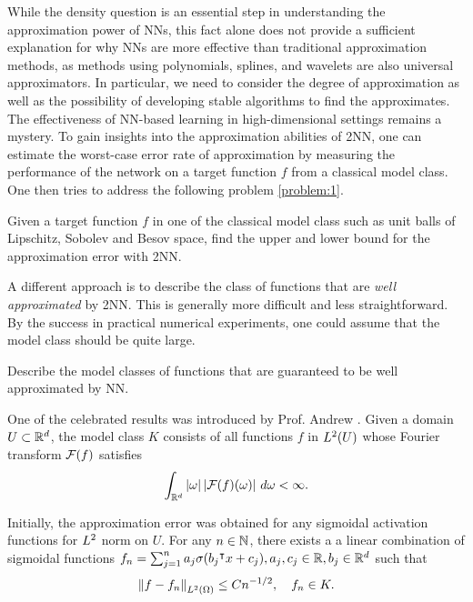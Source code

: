
While the density question is an essential step in understanding the
approximation power of NNs, this fact alone does not provide a sufficient
explanation for why NNs are more effective than traditional approximation
methods, as methods using polynomials, splines, and wavelets are also universal
approximators. In particular, we need to consider the degree of approximation as
well as the possibility of developing stable algorithms to find the
approximates. The effectiveness of NN-based learning in high-dimensional
settings remains a mystery. To gain insights into the approximation abilities of
2NN, one can estimate the worst-case error rate of approximation by measuring
the performance of the network on a target function $f$ from a classical model
class. One then tries to address the following problem \ref{problem:1}.
\begin{problem}
    \label{problem:1}
    Given a target function $f$ in one of the classical model class such as unit
    balls of Lipschitz, Sobolev and Besov space, find the upper and lower bound
    for the approximation error with 2NN. 
\end{problem}


A different approach is to describe the class of functions that are \textit{well
approximated} by 2NN. This is generally more difficult and less straightforward.
By the success in practical numerical experiments, one could assume that the
model class should be quite large.
\begin{problem}
    \label{problem:2}
    Describe the model classes of functions that are guaranteed to be well
    approximated by NN.
\end{problem}


One of the celebrated results was introduced by Prof. Andrew
\cite{barronApproximationEstimationBounds1994}. Given a domain $U \subset \mathbb{R}^d$,
the model class $K$ consists of all functions $f$ in $L^{2}(U)$ whose Fourier
transform $\mathcal{F}(f)$ satisfies
\begin{equation}
    \int_{\mathbb{R}^d} \left| \omega \right| \left| \mathcal{F}(f)(\omega) \right| \,d\omega < \infty.
\end{equation}

Initially, the approximation error was obtained for any sigmoidal activation
functions for $L^{2}$ norm on $U$. For any $n \in \mathbb{N}$, there exists a a
linear combination of sigmoidal functions $f_n = \sum_{j=1}^n a_j \sigma(b_j{}^{\intercal}
x + c_j), a_j,c_j \in \mathbb{R}, b_j \in \mathbb{R}^d$ such that 
\begin{equation}
    \left\| f - f_n \right\|_{L^{2}(\Omega)} \leq C n^{-1/2}, \quad 
    f_n \in K.
\end{equation}

